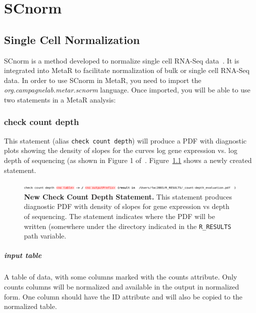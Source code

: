 

\chapter{SCnorm}\label{chap:SCnorm}
\section{Single Cell Normalization}
SCnorm is a method developed to normalize single cell RNA-Seq data~\cite{bacher2017scnorm}. It is integrated into MetaR to facilitate normalization of bulk or single cell RNA-Seq data. In order to use SCnorm in MetaR, you need to import the \textit{org.campagnelab.metar.scnorm} language. Once imported, you will be able to use two statements in a MetaR analysis:

\subsection{check count depth}
This statement (alias \texttt{check count depth}) will produce a PDF with diagnostic plots showing the density of slopes for  the curves log gene expression vs. log depth of sequencing (as shown in Figure 1 of~\cite{bacher2017scnorm}. Figure~\ref{fig:NewSCnormCheckCellCounts} shows a newly created statement.

\begin{figure}[h!tbp]
  \centering
  \includegraphics[width=\figWidthWide]{figures/NewCheckCountDepth.pdf}
\caption[New Check Count Depth Statement.]{\textbf{New Check Count Depth Statement.} This statement produces diagnostic PDF with density of slopes for gene expression vs depth of sequencing. The statement indicates where the PDF will be written (somewhere under the directory indicated in the \texttt{R\_RESULTS} path variable.}
\label{fig:NewSCnormCheckCellCounts}
\end{figure}
\paragraph{input table}
A table of data, with some columns marked with the counts attribute. Only counts columns will be normalized and available in the output in normalized form. One column should have the ID attribute and will also be copied to the normalized table.
